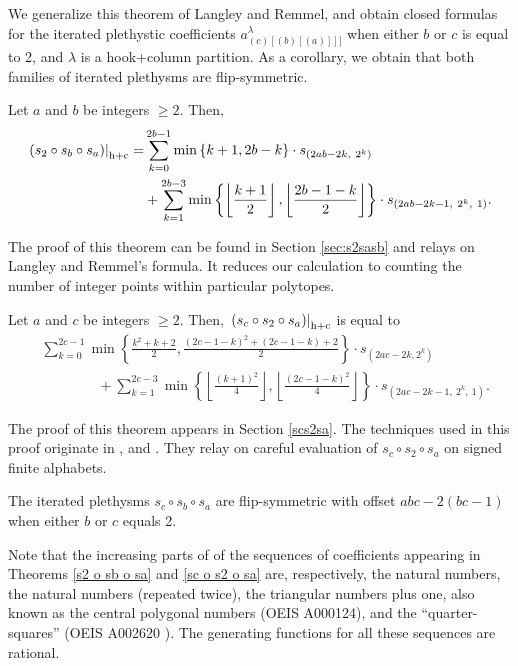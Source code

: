 \documentclass[twoside]{article}
\renewcommand{\hc}[1]{\left.\left(#1\right)\right|_{\textnormal{h+c}}}
\begin{document}
We generalize this theorem of Langley and Remmel, and obtain closed formulas for the iterated plethystic coefficients $a_{(c)[(b)[(a)]]]}^{\lambda}$ when either $b$ or $c$ is equal to 2, and $\lambda$ is a hook+column partition. As a 
corollary, we obtain that both families of iterated plethysms are flip-symmetric.

\begin{thm}\label{s2 o sb o sa}
   Let $a$ and $b$ be integers $\ge2$. Then,
    \begin{align*}
    \hc{s_2\circ s_b\circ s_a} =  &\sum\limits_{k=0}^{2b-1}  \min\left\{k+1, 2b-k\right\} \cdot s_{(2ab-2k,\ 2^{k})}\\
    &+\sum\limits_{k=1}^{2b-3} \min\left\{\left\lfloor\frac{k+1}{2}\right\rfloor, \left\lfloor\frac{2b-1-k}{2}\right\rfloor\right\} \cdot s_{(2ab-2k-1,\ 2^{k},\ 1)}.
     \end{align*}
\end{thm}

The proof of this theorem can be found in Section \ref{sec:s2sasb} and relays on Langley and Remmel's formula. It reduces our calculation to counting the number of integer points within particular polytopes.

   \begin{thm}   \label{sc o s2 o sa}
   Let $a$ and $c$ be integers $\ge2$. Then, $    \hc{s_c\circ s_2\circ s_a} $ is equal to
   \begin{align*}
 &\sum\limits_{k=0}^{2c-1}\min\left\{\frac{k^2+k+2}{2},\frac{(2c-1-k)^2+(2c-1-k)+2}{2}\right\}\cdot s_{(2ac-2k, 2^k)}\\
    &\qquad\qquad+ \sum\limits_{k=1}^{2c-3}\min\left\{\left\lfloor\frac{(k+1)^2}{4}\right\rfloor,\left\lfloor\frac{(2c-1-k)^2}{4}\right\rfloor\right\}\cdot s_{(2ac-2k-1,\ 2^k,\ 1)}.
   \end{align*}

\end{thm}

The proof of this theorem appears in Section \ref{scs2sa}. The techniques used in this proof originate in \cite{rosas}, and \cite{langley}. They relay on careful evaluation of $s_c\circ s_2\circ s_a$ on signed finite alphabets.



\begin{cor}
The iterated plethysms $s_c\circ s_b\circ s_a$ are flip-symmetric with offset $abc-2(bc-1)$ when either $b$ or $c$ equals 2.
\end{cor}

Note that the increasing parts of of the sequences of coefficients
appearing in Theorems \ref{s2 o sb o sa} and  \ref{sc o s2 o sa} 
are, respectively,  the  natural numbers, the natural numbers (repeated
twice), the triangular numbers plus one, also known as the
central polygonal numbers (OEIS A000124), and the ``quarter-squares'' (OEIS A002620 \cite{oeis}). The generating functions for all these sequences are rational.
\end{document}
